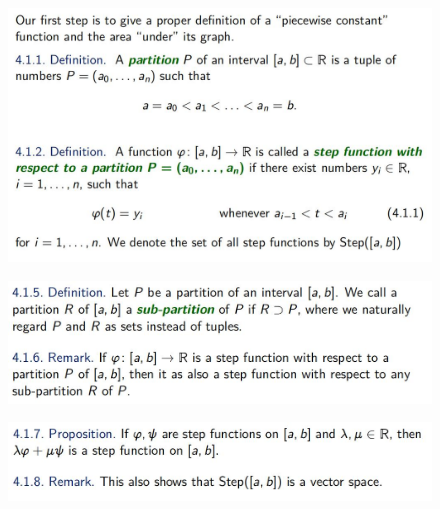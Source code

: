\documentclass{beamer}
\begin{document}
\begin{frame}
    \begin{figure}[htbp]
        \centering
        \includegraphics[width=12cm]{pic2.png}
    \end{figure}
\end{frame}

\begin{frame}
    \begin{figure}[htbp]
        \centering
        \includegraphics[width=12cm]{pic3.png}
    \end{figure}
    \begin{figure}[htbp]
        \centering
        \includegraphics[width=12cm]{pic4.png}
    \end{figure}
\end{frame}
\end{document}
